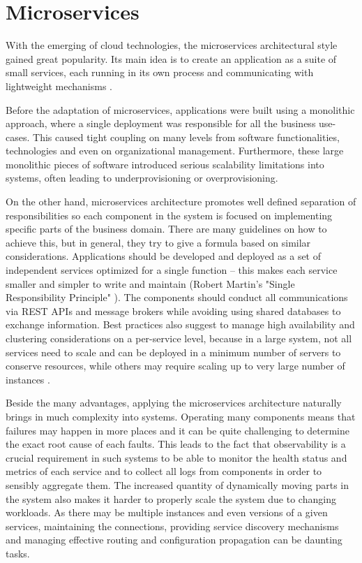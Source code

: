 \section{Microservices}

With the emerging of cloud technologies, the microservices architectural style gained great popularity. Its main idea is to create an application as a suite of small services, each running in its own process and communicating with lightweight mechanisms \cite{MicroservicesMF}.

Before the adaptation of microservices, applications were built using a monolithic approach, where a single deployment was responsible for all the business use-cases. This caused tight coupling on many levels from software functionalities, technologies and even on organizational management. Furthermore, these large monolithic pieces of software introduced serious scalability limitations into systems, often leading to underprovisioning or overprovisioning.

On the other hand, microservices architecture promotes well defined separation of responsibilities so each component in the system is focused on implementing specific parts of the business domain. There are many guidelines on how to achieve this, but in general, they try to give a formula based on similar considerations. Applications should be developed and deployed as a set of independent services optimized for a single function -- this makes each service smaller and simpler to write and maintain (Robert Martin's "Single Responsibility Principle" \cite{RobertMartinOOP}). The components should conduct all communications via REST APIs and message brokers while avoiding using shared databases to exchange information. Best practices also suggest to manage high availability and clustering considerations on a per-service level, because in a large system, not all services need to scale and can be deployed in a minimum number of servers to conserve resources, while others may require scaling up to very large number of instances \cite{ImplPatternsMicrosServices}.

Beside the many advantages, applying the microservices architecture naturally brings in much complexity into systems. Operating many components means that failures may happen in more places and it can be quite challenging to determine the exact root cause of each faults. This leads to the fact that observability is a crucial requirement in such systems to be able to monitor the health status and metrics of each service and to collect all logs from components in order to sensibly aggregate them. The increased quantity of dynamically moving parts in the system also makes it harder to properly scale the system due to changing workloads. As there may be multiple instances and even versions of a given services, maintaining the connections, providing service discovery mechanisms and managing effective routing and configuration propagation can be daunting tasks.


